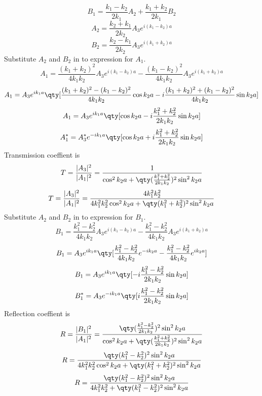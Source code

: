 \[B_1=\frac{k_1-k_2}{2k_1}A_2+\frac{k_1+k_2}{2k_1}B_2\]
\[A_2=\frac{k_2+k_1}{2k_2}A_3e^{i(k_1-k_2)a}\]
\[B_2=\frac{k_2-k_1}{2k_2}A_3e^{i(k_1+k_2)a}\]
Substitute $A_2$ and $B_2$ in to expression for $A_1$.\\
\[A_1=\frac{(k_1+k_2)^2}{4k_1k_2}A_3e^{i(k_1-k_2)a}-\frac{(k_1-k_2)^2}{4k_1k_2}A_3e^{i(k_1+k_2)a}\]
\[A_1=A_3e^{ik_1a}\qty[\frac{(k_1+k_2)^2-(k_1-k_2)^2}{4k_1k_2}\cos k_2a-i\frac{(k_1+k_2)^2+(k_1-k_2)^2}{4k_1k_2}\sin k_2a]\]
\[A_1=A_3e^{ik_1a}\qty[\cos k_2a-i\frac{k^2_1+k^2_2}{2k_1k_2}\sin k_2a]\]
\[A_1^*=A_3^*e^{-ik_1a}\qty[\cos k_2a+i\frac{k^2_1+k^2_2}{2k_1k_2}\sin k_2a]\]
\newpage
Transmission coeffient is
\[T=\frac{|A_3|^2}{|A_1|^2}=\frac{1}{\cos^2 k_2a+\qty(\frac{k^2_1+k^2_2}{2k_1k_2})^2\sin^2 k_2a}\]
\[T=\frac{|A_3|^2}{|A_1|^2}=\frac{4k^2_1k^2_2}{4k^2_1k^2_2\cos^2 k_2a+\qty(k^2_1+k^2_2)^2\sin^2 k_2a}\]
Substitute $A_2$ and $B_2$ in to expression for $B_1$.\\
\[B_1=\frac{k^2_1-k^2_2}{4k_1k_2}A_3e^{i(k_1-k_2)a}-\frac{k^2_1-k^2_2}{4k_1k_2}A_3e^{i(k_1+k_2)a}\]
\[B_1=A_3e^{ik_1a}\qty[\frac{k^2_1-k^2_2}{4k_1k_2}e^{-ik_2a}-\frac{k^2_1-k^2_2}{4k_1k_2}e^{ik_2a}]\]
\[B_1=A_3e^{ik_1a}\qty[-i\frac{k^2_1-k^2_2}{2k_1k_2}\sin k_2a]\]
\[B_1^*=A_3e^{-ik_1a}\qty[i\frac{k^2_1-k^2_2}{2k_1k_2}\sin k_2a]\]
Reflection coeffient is
\[R=\frac{|B_1|^2}{|A_1|^2}=\frac{\qty(\frac{k^2_1-k^2_2}{2k_1k_2})^2\sin^2 k_2a}{\cos^2 k_2a+\qty(\frac{k^2_1+k^2_2}{2k_1k_2})^2\sin^2 k_2a}\]
\[R=\frac{\qty(k^2_1-k^2_2)^2\sin^2 k_2a}{4k_1^2k_2^2\cos^2 k_2a+\qty(k^2_1+k^2_2)^2\sin^2 k_2a}\]
\[R=\frac{\qty(k^2_1-k^2_2)^2\sin^2 k_2a}{4k_1^2k_2^2+\qty(k^2_1-k^2_2)^2\sin^2 k_2a}\]